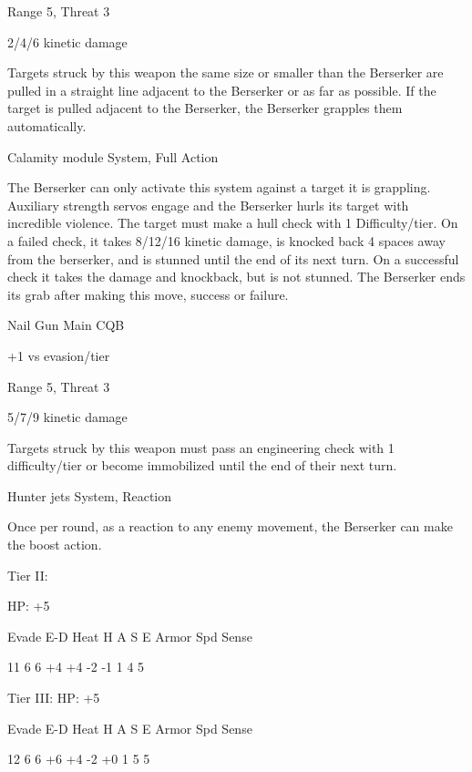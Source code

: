 Range 5, Threat 3
 
2/4/6 kinetic damage
 
Targets struck by this weapon the same size or smaller than the Berserker are pulled in a straight  
line adjacent to the Berserker or as far as possible. If the target is pulled adjacent to the  
Berserker, the Berserker grapples them automatically.
 

Calamity module  
System, Full Action
 
The Berserker can only activate this system against a target it is grappling. Auxiliary strength  
servos engage and the Berserker hurls its target with incredible violence. The target must make a  
hull check with 1 Difficulty/tier. On a failed check, it takes 8/12/16 kinetic damage, is knocked  
back 4 spaces away from the berserker, and is stunned until the end of its next turn. On a  
successful check it takes the damage and knockback, but is not stunned. The Berserker ends its  
grab after making this move, success or failure.
 

Nail Gun  
Main CQB
 
+1 vs evasion/tier
 
Range 5, Threat 3
 
5/7/9 kinetic damage
 
Targets struck by this weapon must pass an engineering check with 1 difficulty/tier or become  
immobilized until the end of their next turn.
 

Hunter jets  
System, Reaction
 
Once per round, as a reaction to any enemy movement, the Berserker can make the boost  
action.
 

Tier II:
 
HP: +5
 

          Evade     E-D    Heat    H    A     S     E       Armor        Spd       Sense 

          11       6      6        +4   +4    -2    -1       1           4         5 

Tier III:  
HP: +5
 

          Evade     E-D    Heat    H    A     S     E       Armor        Spd       Sense 

          12       6      6        +6   +4    -2    +0       1           5         5 
